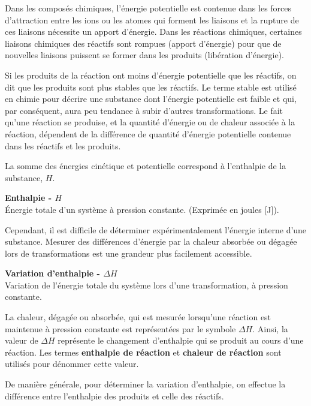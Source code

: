 \documentclass[
  11pt,
  a4paper,
  openany]{book}
\begin{document}
Dans les composés chimiques, l'énergie potentielle est contenue dans les forces d'attraction entre les ions ou les atomes qui forment les liaisons et la rupture de ces liaisons nécessite un apport d'énergie. Dans les réactions chimiques, certaines liaisons chimiques des réactifs sont rompues (apport d'énergie) pour que de nouvelles liaisons puissent se former dans les produits (libération d'énergie).

Si les produits de la réaction ont moins d'énergie potentielle que les réactifs, on dit que les produits sont plus stables que les réactifs. Le terme stable est utilisé en chimie pour décrire une substance dont l'énergie potentielle est faible et qui, par conséquent, aura peu tendance à subir d'autres transformations. Le fait qu'une réaction se produise, et la quantité d'énergie ou de chaleur associée à la réaction, dépendent de la différence de quantité d'énergie potentielle contenue dans les réactifs et les produits.

La somme des énergies cinétique et potentielle correspond à l'enthalpie de la substance, \(H\).

\begin{tcolorbox}
\textbf{Enthalpie - \(H\)}\\
Énergie totale d'un système à pression constante. (Exprimée en joules {[}J{]}).

\end{tcolorbox}

Cependant, il est difficile de déterminer expérimentalement l'énergie interne d'une substance. Mesurer des différences d'énergie par la chaleur absorbée ou dégagée lors de transformations est une grandeur plus facilement accessible.

\begin{tcolorbox}
\textbf{Variation d'enthalpie - \(\Delta H\)}\\
Variation de l'énergie totale du système lors d'une transformation, à pression constante.

\end{tcolorbox}

La chaleur, dégagée ou absorbée, qui est mesurée lorsqu'une réaction est maintenue à pression constante est représentées par le symbole \(\Delta H\). Ainsi, la valeur de \(\Delta H\) représente le changement d'enthalpie qui se produit au cours d'une réaction. Les termes \textbf{enthalpie de réaction} et \textbf{chaleur de réaction} sont utilisés pour dénommer cette valeur.

De manière générale, pour déterminer la variation d'enthalpie, on effectue la différence entre l'enthalpie des produits et celle des réactifs.
\end{document}
